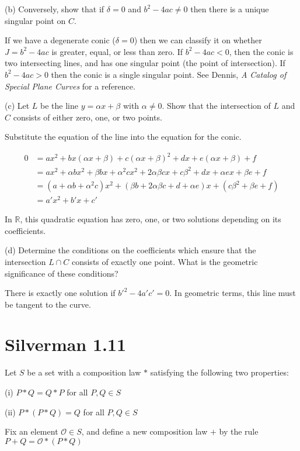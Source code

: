\documentclass{article}
\begin{document}
(b) Conversely, show that if $\delta = 0$ and $b^2 - 4ac \neq 0$ then there is a unique singular point on $C$.

If we have a degenerate conic ($\delta = 0$) then we can classify it on whether $J = b^2 - 4ac$ is greater, equal, or less than zero. If $b^2-4ac < 0$, then the conic is two intersecting lines, and has one singular point (the point of intersection). If $b^2 - 4ac > 0$ then the conic is a single singular point. See Dennis, \textit{A Catalog of Special Plane Curves} for a reference.

(c) Let $L$ be the line $y = \alpha x + \beta$ with $\alpha \neq 0$. Show that the intersection of $L$ and $C$ consists of either zero, one, or two points.

Substitute the equation of the line into the equation for the conic.

\begin{align*}
0 &= ax^2 + bx(\alpha x + \beta) + c(\alpha x + \beta)^2 + dx + e(\alpha x + \beta) + f \\
&= ax^2 + \alpha b x^2 + \beta b x + \alpha^2 c x^2 + 2\alpha\beta c x + c\beta^2 + dx + \alpha e x + \beta e + f \\
&= (a + \alpha b + \alpha^2 c)x^2 + (\beta b + 2\alpha\beta c + d + \alpha e)x + (c\beta^2 + \beta e + f) \\
&= a'x^2 + b'x + c'
\end{align*}

In $\mathbb{R}$, this quadratic equation has zero, one, or two solutions depending on its coefficients.

(d) Determine the conditions on the coefficients which ensure that the intersection $L \cap C$ consists of exactly one point. What is the geometric significance of these conditions?

There is exactly one solution if $b'^2 - 4a'c' = 0$. In geometric terms, this line must be tangent to the curve.

\section{Silverman 1.11}
Let $S$ be a set with a composition law $*$ satisfying the following two properties:

(i) $P*Q = Q*P$ for all $P,Q \in S$

(ii) $P*(P*Q) = Q$ for all $P,Q \in S$

Fix an element $\mathcal{O} \in S$, and define a new composition law $+$ by the rule $P+Q = \mathcal{O} * (P * Q)$
\end{document}
